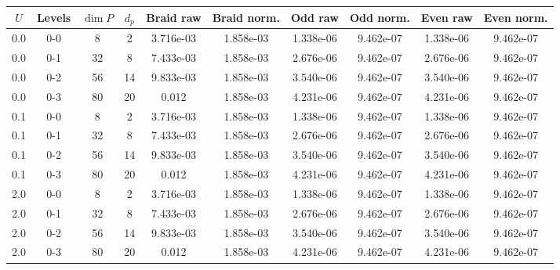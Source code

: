 \begin{tabular}{cccccccccc}
\hline
$U$ & Levels & $\dim P$ & $d_p$ & Braid raw & Braid norm. & Odd raw & Odd norm. & Even raw & Even norm. \\
\hline
0.0 & 0-0 & 8 & 2 & 3.716e-03 & 1.858e-03 & 1.338e-06 & 9.462e-07 & 1.338e-06 & 9.462e-07 \\
0.0 & 0-1 & 32 & 8 & 7.433e-03 & 1.858e-03 & 2.676e-06 & 9.462e-07 & 2.676e-06 & 9.462e-07 \\
0.0 & 0-2 & 56 & 14 & 9.833e-03 & 1.858e-03 & 3.540e-06 & 9.462e-07 & 3.540e-06 & 9.462e-07 \\
0.0 & 0-3 & 80 & 20 & 0.012 & 1.858e-03 & 4.231e-06 & 9.462e-07 & 4.231e-06 & 9.462e-07 \\
0.1 & 0-0 & 8 & 2 & 3.716e-03 & 1.858e-03 & 1.338e-06 & 9.462e-07 & 1.338e-06 & 9.462e-07 \\
0.1 & 0-1 & 32 & 8 & 7.433e-03 & 1.858e-03 & 2.676e-06 & 9.462e-07 & 2.676e-06 & 9.462e-07 \\
0.1 & 0-2 & 56 & 14 & 9.833e-03 & 1.858e-03 & 3.540e-06 & 9.462e-07 & 3.540e-06 & 9.462e-07 \\
0.1 & 0-3 & 80 & 20 & 0.012 & 1.858e-03 & 4.231e-06 & 9.462e-07 & 4.231e-06 & 9.462e-07 \\
2.0 & 0-0 & 8 & 2 & 3.716e-03 & 1.858e-03 & 1.338e-06 & 9.462e-07 & 1.338e-06 & 9.462e-07 \\
2.0 & 0-1 & 32 & 8 & 7.433e-03 & 1.858e-03 & 2.676e-06 & 9.462e-07 & 2.676e-06 & 9.462e-07 \\
2.0 & 0-2 & 56 & 14 & 9.833e-03 & 1.858e-03 & 3.540e-06 & 9.462e-07 & 3.540e-06 & 9.462e-07 \\
2.0 & 0-3 & 80 & 20 & 0.012 & 1.858e-03 & 4.231e-06 & 9.462e-07 & 4.231e-06 & 9.462e-07 \\
\hline
\end{tabular}
